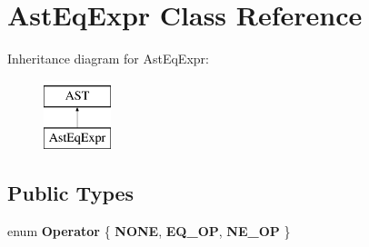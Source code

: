 \hypertarget{classAstEqExpr}{\section{Ast\-Eq\-Expr Class Reference}
\label{classAstEqExpr}
}
Inheritance diagram for Ast\-Eq\-Expr\-:\begin{figure}[H]
\begin{center}
\leavevmode
\includegraphics[height=2.000000cm]{classAstEqExpr}
\end{center}
\end{figure}
\subsection*{Public Types}
\begin{DoxyCompactItemize}
\item 
enum {\bfseries Operator} \{ {\bfseries N\-O\-N\-E}, 
{\bfseries E\-Q\-\_\-\-O\-P}, 
{\bfseries N\-E\-\_\-\-O\-P}
 \}
\end{DoxyCompactItemize}
